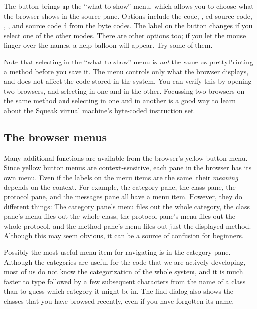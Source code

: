 \documentclass[a4paper,10pt,twoside]{book}
\begin{document}
The  button brings up the ``what to show'' menu, which allows you to choose what the browser shows in the source pane.  Options include the  code, , ed source code, , , and source code d from the byte codes.
The label on the button changes if you select one of the other modes.
There are other options too; if you let the mouse linger over the names, a help balloon will appear.
Try some of them.

Note that selecting  in the ``what to show'' menu is \emph{not} the same as prettyPrinting a method before you save it.
The menu controls only what the browser displays, and does not affect the code stored in the system.
You can verify this by opening two browsers, and selecting  in one and  in the other.
Focussing two browsers on the same method and selecting  in one and  in another is a good way to learn about the Squeak virtual machine's byte-coded instruction set.

\subsection{The browser menus}

Many additional functions are available from the browser's yellow button menu.
Since yellow button menus are context-sensitive,  each pane in the browser has its own menu.
Even if the labels on the menu items are the same, their \emph{meaning} depends on the context.
For example, the category pane, the class pane, the protocol pane, and the messages pane all have a  menu item.
However, they do different things:
The category pane's  menu files out the whole category, the class pane's  menu files-out the whole class, the protocol pane's  menu files out the whole protocol, and the method pane's  menu files-out just the displayed method.
Although this may seem obvious, it can be a source of confusion for beginners.

Possibly the most useful menu item for navigating is  in the category pane.
Although the categories are useful for the code that we are actively developing, most of us do not know the categorization of the whole system, and it is much faster to type  followed by a few subsequent characters from the name of a class than to guess which category it might be in.
The find dialog also shows the classes that you have browsed recently, even if you have forgotten its name.
\end{document}
